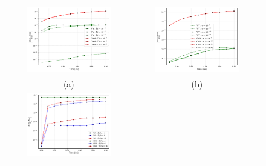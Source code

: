 \begin{figure}
\begin{center}
\begin{tabular}{cc}
\hspace*{-1.0cm}
\includegraphics[width=0.7\textwidth]{plots/raindrop/raindrop_mass_conv_16ppd.png} & 
\hspace{-0.2cm}%
\includegraphics[width=0.7\textwidth]{plots/raindrop/raindrop_mass_conv_clipping.png} \\ 
\hspace{-0.2cm}%
(a) & (b) \\
\hspace*{-1.0cm}
\includegraphics[width=0.7\textwidth]{plots/raindrop/raindrop_mass_conv_resolution.png} & 

\end{tabular}
\end{center}
\end{figure}
